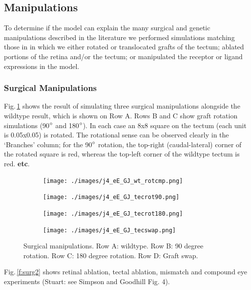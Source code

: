 \documentclass[11pt, a4paper]{article}
\begin{document}
\subsection*{Manipulations}

To determine if the model can explain the many surgical and genetic
manipulations described in the literature
\citep*[for a review, see][]{goodhill_retinotectal_1999} we performed
simulations matching those in \citet{simpson_simple_2011} in which we either
rotated or translocated grafts of the tectum; ablated portions of the retina
and/or the tectum; or manipulated the receptor or ligand expressions in the
model.

\subsubsection*{Surgical Manipulations}

Fig.\,\ref{f:surg1} shows the result of simulating three surgical
manipulations alongside the wildtype result, which is shown on Row A. Rows B
and C show graft rotation simulations (90$\degree$ and 180$\degree$). In each
case an 8x8 square on the tectum (each unit is 0.05x0.05) is rotated. The
rotational sense can be observed clearly in the `Branches' column; for the
90$\degree$ rotation, the top-right (caudal-lateral) corner of the rotated
square is red, whereas the top-left corner of the wildtype tectum is red. \textbf{etc}.



\begin{figure}
\begin{subfigure}{\linewidth}
\texttt{[image: ./images/j4\_eE\_GJ\_wt\_rotcmp.png]}
\end{subfigure}
\begin{subfigure}{\linewidth}
\texttt{[image: ./images/j4\_eE\_GJ\_tecrot90.png]}
\end{subfigure}
\begin{subfigure}{\linewidth}
\texttt{[image: ./images/j4\_eE\_GJ\_tecrot180.png]}
\end{subfigure}
\begin{subfigure}{\linewidth}
\texttt{[image: ./images/j4\_eE\_GJ\_tecswap.png]}
\end{subfigure}
\caption{Surgical manipulations. Row A: wildtype. Row B: 90 degree
rotation. Row C: 180 degree rotation. Row D: Graft swap.}
\label{f:surg1}
\end{figure}

Fig.\,\ref{f:surg2} shows retinal ablation, tectal ablation, mismatch and
compound eye experiments (Stuart: see Simpson and Goodhill Fig. 4).
\end{document}
